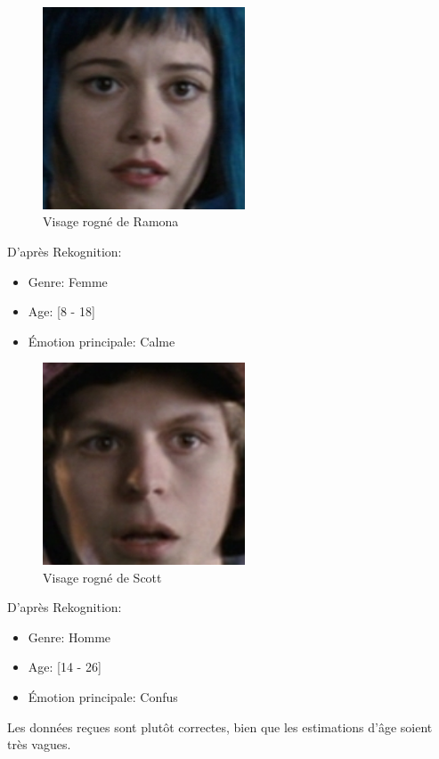 \begin{figure}[H]
	\centering
	\includegraphics[width=6cm]{images/facial_reco/ramona.png}
    \caption{Visage rogné de Ramona}
	\label{fig:hidden_face_ramona}
\end{figure}

D'après Rekognition:
\begin{itemize}
    \item Genre: Femme
    \item Age: [8 - 18]
    \item Émotion principale: Calme 
\end{itemize}

\begin{figure}[H]
	\centering
	\includegraphics[width=6cm]{images/facial_reco/scott_hidden.png}
    \caption{Visage rogné de Scott}
	\label{fig:hidden_face_scott}
\end{figure}

D'après Rekognition:
\begin{itemize}
    \item Genre: Homme
    \item Age: [14 - 26]
    \item Émotion principale: Confus 
\end{itemize}

Les données reçues sont plutôt correctes, bien que les estimations d'âge soient très vagues.

